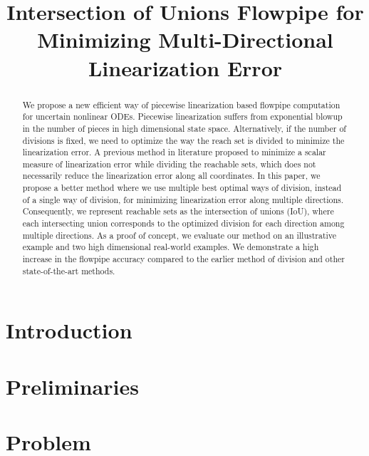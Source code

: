 


\title{Intersection of Unions Flowpipe for Minimizing Multi-Directional Linearization Error}
\author{}
\institute{}
%
    
\maketitle
%
\begin{abstract}
We propose a new efficient way of piecewise linearization based
flowpipe computation for uncertain nonlinear ODEs.  Piecewise
linearization suffers from exponential blowup in the number of pieces
in high dimensional state space.  Alternatively, if the number of
divisions is fixed, we need to optimize the way the reach set is
divided to minimize the linearization error. A previous method in
literature proposed to minimize a scalar measure of linearization
error while dividing the reachable sets, which does not necessarily
reduce the linearization error along all coordinates.  In this paper,
we propose a better method where we use multiple best optimal ways of
division, instead of a single way of division, for minimizing
linearization error along multiple directions.  Consequently, we
represent reachable sets as the intersection of unions
(IoU), where each intersecting union corresponds to the optimized
division for each direction among multiple directions.  As a proof of
concept, we evaluate our method on an illustrative example and two
high dimensional real-world examples.  We demonstrate a high increase
in the flowpipe accuracy compared to the earlier method of division
and other state-of-the-art methods.
\end{abstract}

\section{Introduction}

%
\section{Preliminaries}

%
\section{Problem}

%
